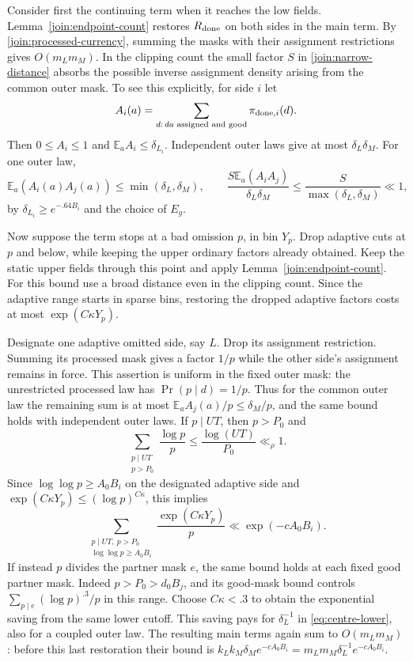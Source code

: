 Consider first the continuing term when it reaches the low fields.
Lemma~\ref{join:endpoint-count} restores
$R_{\rm done}$ on both sides in the main term. By
\eqref{join:processed-currency}, summing the masks with their assignment
restrictions gives $O(m_Lm_M)$. In the clipping count the small factor
$S$ in \eqref{join:narrow-distance} absorbs the possible inverse
assignment density arising from the common outer mask.
To see this explicitly, for side $i$ let
\[
 A_i(a)=\sum_{\substack{d:\,da\text{ assigned and good}}}
               \pi_{{\rm done},i}(d).
\]
Then $0\le A_i\le1$ and $\mathbb E_a A_i\le\delta_{L_i}$.
Independent outer laws give at most $\delta_L\delta_M$. For one
outer law,
\[
 \mathbb E_a(A_i(a)A_j(a))\le\min(\delta_L,\delta_M),\qquad
 \frac{S\mathbb E_a(A_iA_j)}{\delta_L\delta_M}
 \le\frac{S}{\max(\delta_L,\delta_M)}\ll1,
\]
by $\delta_{L_i}\ge e^{-.64B_i}$ and the choice of $E_g$.

Now suppose the term stops at a bad omission $p$, in bin $Y_p$. Drop
adaptive cuts at $p$ and below, while keeping the upper ordinary
factors already obtained. Keep the static upper fields through this
point and apply Lemma~\ref{join:endpoint-count}. For this bound use a
broad distance even in the clipping count. Since the adaptive range
starts in sparse bins, restoring the dropped adaptive factors costs
at most $\exp(C\kappa Y_p)$.

Designate one adaptive omitted side, say $L$. Drop its assignment
restriction. Summing its processed mask gives a factor $1/p$ while
the other side's assignment remains in force. This assertion is
uniform in the fixed outer mask: the unrestricted processed law has
$\Pr(p\mid d)=1/p$. Thus for the common outer law the remaining sum
is at most $\mathbb E_a A_j(a)/p\le\delta_M/p$, and the same bound
holds with independent outer laws. If $p\mid UT$, then
$p>P_0$ and
\[
 \sum_{\substack{p\mid UT\\p>P_0}}\frac{\log p}{p}
 \le \frac{\log(UT)}{P_0}\ll_\rho1.
\]
Since $\log\log p\ge A_0B_i$ on the designated adaptive side and
$\exp(C\kappa Y_p)\le(\log p)^{C\kappa}$, this implies
\begin{equation}\label{join:bad-prime-saving}
 \sum_{\substack{p\mid UT,\ p>P_0\\
                  \log\log p\ge A_0B_i}}
 \frac{\exp(C\kappa Y_p)}p
 \ll \exp(-cA_0B_i).
\end{equation}
If instead $p$ divides the partner mask $e$, the same bound holds at
each fixed good partner mask. Indeed $p>P_0>d_0B_j$, and its good-mask
bound controls $\sum_{p\mid e}(\log p)^{.3}/p$ in this range. Choose
$C\kappa<.3$ to obtain the exponential saving from the same lower
cutoff. This saving pays for $\delta_L^{-1}$ in
\eqref{eq:centre-lower}, also for a coupled outer law. The resulting
main terms again sum to $O(m_Lm_M)$: before this last restoration
their bound is
$k_Lk_M\delta_M e^{-cA_0B_i}
 =m_Lm_M\delta_L^{-1}e^{-cA_0B_i}$.

